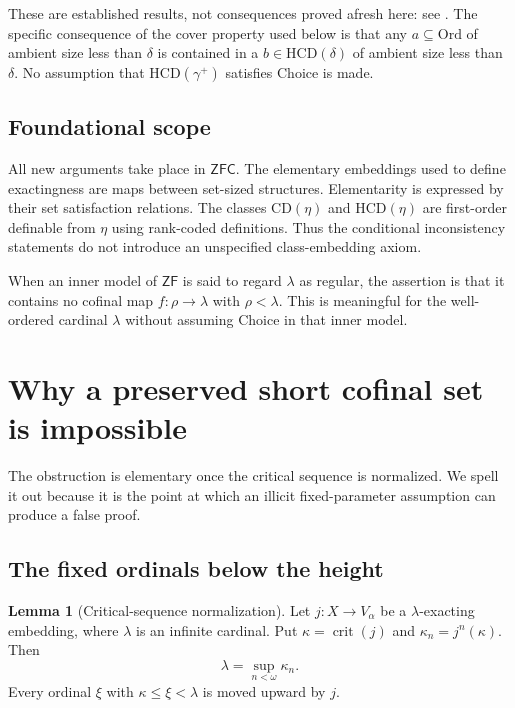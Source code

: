 \documentclass[11pt,letterpaper]{article}
\theoremstyle{definition}
\newtheorem{lemma}[definition]{Lemma}
\newcommand{\ZFC}{\mathsf{ZFC}}
\newcommand{\ZF}{\mathsf{ZF}}
\newcommand{\crit}{\operatorname{crit}}
\newcommand{\Ord}{\mathrm{Ord}}
\newcommand{\CD}{\mathrm{CD}}
\newcommand{\HCD}{\mathrm{HCD}}
\numberwithin{equation}{section}
\begin{document}
These are established results, not consequences proved afresh here: see \cite[Proposition~4.3; Theorems~4.4, 4.10, 4.14--4.15; Proposition~4.11]{uniqueness}. The specific consequence of the cover property used below is that any $a\subseteq\Ord$ of ambient size less than $\delta$ is contained in a $b\in\HCD(\delta)$ of ambient size less than $\delta$. No assumption that $\HCD(\gamma^+)$ satisfies Choice is made.

\subsection{Foundational scope}

All new arguments take place in $\ZFC$. The elementary embeddings used to define exactingness are maps between set-sized structures. Elementarity is expressed by their set satisfaction relations. The classes $\CD(\eta)$ and $\HCD(\eta)$ are first-order definable from $\eta$ using rank-coded definitions. Thus the conditional inconsistency statements do not introduce an unspecified class-embedding axiom.

When an inner model of $\ZF$ is said to regard $\lambda$ as regular, the assertion is that it contains no cofinal map $f:\rho\to\lambda$ with $\rho<\lambda$. This is meaningful for the well-ordered cardinal $\lambda$ without assuming Choice in that inner model.

\section{Why a preserved short cofinal set is impossible}\label{sec:relative}

The obstruction is elementary once the critical sequence is normalized. We spell it out because it is the point at which an illicit fixed-parameter assumption can produce a false proof.

\subsection{The fixed ordinals below the height}

\begin{lemma}[Critical-sequence normalization]\label{lem:critical}
Let $j:X\to V_\alpha$ be a $\lambda$-exacting embedding, where $\lambda$ is an infinite cardinal. Put $\kappa=\crit(j)$ and $\kappa_n=j^n(\kappa)$. Then
\[
 \lambda=\sup_{n<\omega}\kappa_n.
\]
Every ordinal $\xi$ with $\kappa\leq\xi<\lambda$ is moved upward by $j$.
\end{lemma}
\end{document}
